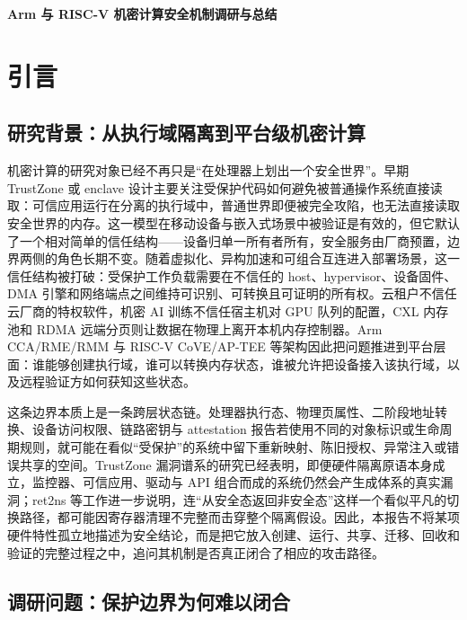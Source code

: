 \documentclass[11pt]{ctexart}
\begin{document}
\begin{center}
  \vspace*{0.18in}
  {\fontsize{22}{30}\selectfont\bfseries Arm 与 RISC-V 机密计算安全机制调研与总结\par}
\end{center}
\vspace{0.28in}

\section{引言}

\subsection{研究背景：从执行域隔离到平台级机密计算}

机密计算的研究对象已经不再只是“在处理器上划出一个安全世界”。早期 TrustZone 或 enclave 设计主要关注受保护代码如何避免被普通操作系统直接读取：可信应用运行在分离的执行域中，普通世界即便被完全攻陷，也无法直接读取安全世界的内存。这一模型在移动设备与嵌入式场景中被验证是有效的，但它默认了一个相对简单的信任结构——设备归单一所有者所有，安全服务由厂商预置，边界两侧的角色长期不变。随着虚拟化、异构加速和可组合互连进入部署场景，这一信任结构被打破：受保护工作负载需要在不信任的 host、hypervisor、设备固件、DMA 引擎和网络端点之间维持可识别、可转换且可证明的所有权。云租户不信任云厂商的特权软件，机密 AI 训练不信任宿主机对 GPU 队列的配置，CXL 内存池和 RDMA 远端分页则让数据在物理上离开本机内存控制器。Arm CCA/RME/RMM 与 RISC-V CoVE/AP-TEE 等架构因此把问题推进到平台层面：谁能够创建执行域，谁可以转换内存状态，谁被允许把设备接入该执行域，以及远程验证方如何获知这些状态。\cite{li2022cca,sahita2023cove}

这条边界本质上是一条跨层状态链。处理器执行态、物理页属性、二阶段地址转换、设备访问权限、链路密钥与 attestation 报告若使用不同的对象标识或生命周期规则，就可能在看似“受保护”的系统中留下重新映射、陈旧授权、异常注入或错误共享的空间。TrustZone 漏洞谱系的研究已经表明，即便硬件隔离原语本身成立，监控器、可信应用、驱动与 API 组合而成的系统仍然会产生成体系的真实漏洞；ret2ns 等工作进一步说明，连“从安全态返回非安全态”这样一个看似平凡的切换路径，都可能因寄存器清理不完整而击穿整个隔离假设。因此，本报告不将某项硬件特性孤立地描述为安全结论，而是把它放入创建、运行、共享、迁移、回收和验证的完整过程之中，追问其机制是否真正闭合了相应的攻击路径。

\subsection{调研问题：保护边界为何难以闭合}
\end{document}
